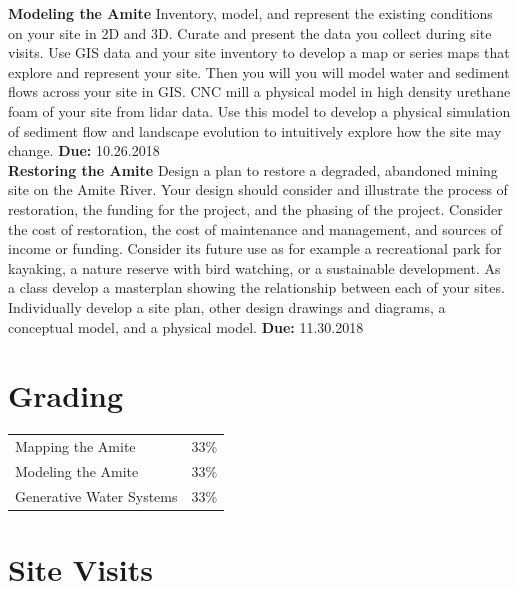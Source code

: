\documentclass[11pt,article,oneside]{memoir}
\begin{document}
\noindent \textbf{Modeling the Amite}
Inventory, model, and represent the existing conditions
on your site in 2D and 3D.
Curate and present the data you collect during site visits.
Use GIS data and your site inventory
to develop a map or series maps that explore and represent your site.
Then you will you will model water and sediment flows across your site in GIS.
CNC mill a physical model in high density urethane foam
of your site from lidar data.
Use this model to develop a physical simulation of sediment flow
and landscape evolution to intuitively explore how the site may change.
\textbf{Due:} 10.26.2018 \\

\noindent \textbf{Restoring the Amite}
Design a plan to restore a degraded, abandoned mining site
on the Amite River.
Your design should consider and illustrate the process of restoration,
the funding for the project, and the phasing of the project.
Consider the cost of restoration, the cost of maintenance and management,
and sources of income or funding.
Consider its future use as for example
a recreational park for kayaking,
a nature reserve with bird watching,
or a sustainable development.
As a class develop a masterplan showing the relationship
between each of your sites.
Individually develop a site plan, other design drawings and diagrams,
a conceptual model, and a physical model.
\textbf{Due:} 11.30.2018 \\

\section{Grading}
%
\begin{table}[H]
\begin{tabular}{l r}
%
Mapping the Amite & 33\% \\
Modeling the Amite & 33\% \\
Generative Water Systems & 33\% \\
%
\end{tabular}
\end{table}

\clearpage

\section{Site Visits}
\end{document}
